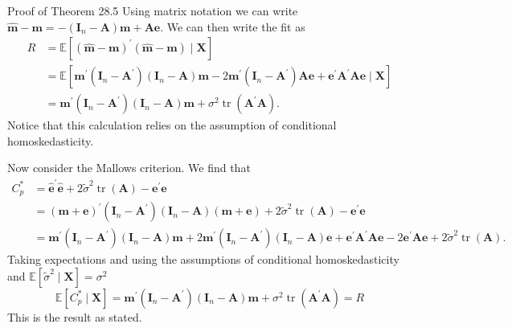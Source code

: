 \documentclass[10pt]{article}
\begin{document}
Proof of Theorem 28.5 Using matrix notation we can write $\widehat{\boldsymbol{m}}-\boldsymbol{m}=-\left(\boldsymbol{I}_{n}-\boldsymbol{A}\right) \boldsymbol{m}+\boldsymbol{A} \boldsymbol{e}$. We can then write the fit as
$$
\begin{aligned}
R &=\mathbb{E}\left[(\widehat{\boldsymbol{m}}-\boldsymbol{m})^{\prime}(\widehat{\boldsymbol{m}}-\boldsymbol{m}) \mid \boldsymbol{X}\right] \\
&=\mathbb{E}\left[\boldsymbol{m}^{\prime}\left(\boldsymbol{I}_{n}-\boldsymbol{A}^{\prime}\right)\left(\boldsymbol{I}_{n}-\boldsymbol{A}\right) \boldsymbol{m}-2 \boldsymbol{m}^{\prime}\left(\boldsymbol{I}_{n}-\boldsymbol{A}^{\prime}\right) \boldsymbol{A} \boldsymbol{e}+\boldsymbol{e}^{\prime} \boldsymbol{A}^{\prime} \boldsymbol{A} \boldsymbol{e} \mid \boldsymbol{X}\right] \\
&=\boldsymbol{m}^{\prime}\left(\boldsymbol{I}_{n}-\boldsymbol{A}^{\prime}\right)\left(\boldsymbol{I}_{n}-\boldsymbol{A}\right) \boldsymbol{m}+\sigma^{2} \operatorname{tr}\left(\boldsymbol{A}^{\prime} \boldsymbol{A}\right) .
\end{aligned}
$$
Notice that this calculation relies on the assumption of conditional homoskedasticity.

Now consider the Mallows criterion. We find that
$$
\begin{aligned}
C_{p}^{*} &=\widehat{\boldsymbol{e}}^{\prime} \widehat{\boldsymbol{e}}+2 \widetilde{\sigma}^{2} \operatorname{tr}(\boldsymbol{A})-\boldsymbol{e}^{\prime} \boldsymbol{e} \\
&=(\boldsymbol{m}+\boldsymbol{e})^{\prime}\left(\boldsymbol{I}_{n}-\boldsymbol{A}^{\prime}\right)\left(\boldsymbol{I}_{n}-\boldsymbol{A}\right)(\boldsymbol{m}+\boldsymbol{e})+2 \widetilde{\sigma}^{2} \operatorname{tr}(\boldsymbol{A})-\boldsymbol{e}^{\prime} \boldsymbol{e} \\
&=\boldsymbol{m}^{\prime}\left(\boldsymbol{I}_{n}-\boldsymbol{A}^{\prime}\right)\left(\boldsymbol{I}_{n}-\boldsymbol{A}\right) \boldsymbol{m}+2 \boldsymbol{m}^{\prime}\left(\boldsymbol{I}_{n}-\boldsymbol{A}^{\prime}\right)\left(\boldsymbol{I}_{n}-\boldsymbol{A}\right) \boldsymbol{e}+\boldsymbol{e}^{\prime} \boldsymbol{A}^{\prime} \boldsymbol{A} \boldsymbol{e}-2 \boldsymbol{e}^{\prime} \boldsymbol{A} \boldsymbol{e}+2 \widetilde{\sigma}^{2} \operatorname{tr}(\boldsymbol{A}) .
\end{aligned}
$$
Taking expectations and using the assumptions of conditional homoskedasticity and $\mathbb{E}\left[\widetilde{\sigma}^{2} \mid \boldsymbol{X}\right]=\sigma^{2}$
$$
\mathbb{E}\left[C_{p}^{*} \mid \boldsymbol{X}\right]=\boldsymbol{m}^{\prime}\left(\boldsymbol{I}_{n}-\boldsymbol{A}^{\prime}\right)\left(\boldsymbol{I}_{n}-\boldsymbol{A}\right) \boldsymbol{m}+\sigma^{2} \operatorname{tr}\left(\boldsymbol{A}^{\prime} \boldsymbol{A}\right)=R
$$
This is the result as stated.
\end{document}
